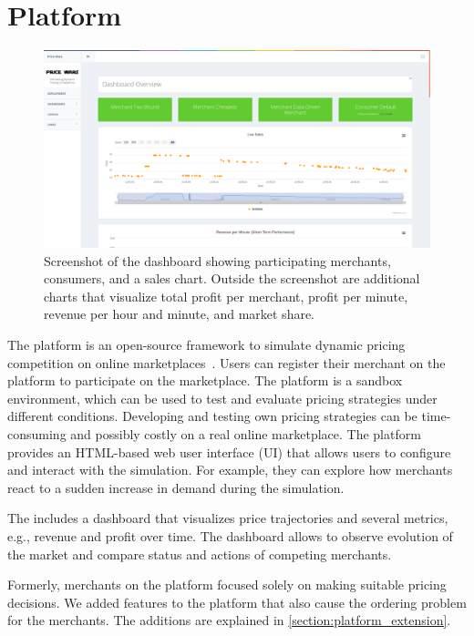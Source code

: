 
\chapter{\pricewars Platform}
\label{chapter:platform}

\begin{figure}[h]
	\centering
	\includegraphics[width=\textwidth]{figures/dashboard}
	\caption[Screenshot of the \pricewars Dashboard]{Screenshot of the \pricewars dashboard showing participating merchants, consumers, and a sales chart. Outside the screenshot are additional charts that visualize total profit per merchant, profit per minute, revenue per hour and minute, and market share.}
	\label{fig:dashboard}
\end{figure}


The \pricewars platform is an open-source framework to simulate dynamic pricing competition on online marketplaces~\cite{DBLP:conf/recsys/0001SPSBLLSU17, edoc2017pricewars}.
Users can register their merchant on the platform to participate on the marketplace.
The platform is a sandbox environment, which can be used to test and evaluate pricing strategies under different conditions.
Developing and testing own pricing strategies can be time-consuming and possibly costly on a real online marketplace.
The platform provides an HTML-based web user interface (UI) that allows users to configure and interact with the simulation.
For example, they can explore how merchants react to a sudden increase in demand during the simulation.

The \ui includes a dashboard that visualizes price trajectories and several metrics, e.g., revenue and profit over time.
The dashboard allows to observe evolution of the market and compare status and actions of competing merchants.

Formerly, merchants on the \pricewars platform focused solely on making suitable pricing decisions.
We added features to the platform that also cause the ordering problem for the merchants.
The additions are explained in \cref{section:platform_extension}. 


